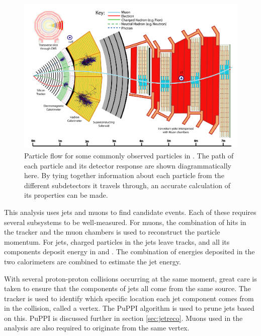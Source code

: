 \begin{figure}[!tp]
    \centering
    \includegraphics[width=\textwidth]{figures/particle_flow_detector.pdf}
    \caption[
       Particle Flow in CMS.
    ]{
        Particle flow for some commonly observed particles in \CMS. The path of each particle and its detector response are shown diagrammatically here. By tying together information about each particle from the different subdetectors it travels through, an accurate calculation of its properties can be made.
    }
    \label{fig:particle_flow_cms}
\end{figure}

This analysis uses jets and muons to find candidate \WR events. Each of these requires several subsystems to be well-measured. For muons, the combination of hits in the tracker and the muon chambers is used to reconstruct the particle momentum. For jets, charged particles in the jets leave tracks, and all its components deposit energy in \ECAL and \HCAL. The combination of energies deposited in the two calorimeters are combined to estimate the jet energy.

With several proton-proton collisions occurring at the same moment, great care is taken to ensure that the components of jets all come from the same source. The tracker is used to identify which specific location each jet component comes from in the collision, called a vertex. The PuPPI algorithm is used to prune jets based on this. PuPPI is discussed further in section \ref{sec:jetreco}. Muons used in the analysis are also required to originate from the same vertex. 

